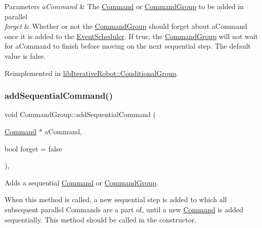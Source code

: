 \begin{DoxyParams}{Parameters}
{\em a\+Command} & The \mbox{\hyperlink{classlib_iterative_robot_1_1_command}{Command}} or \mbox{\hyperlink{classlib_iterative_robot_1_1_command_group}{Command\+Group}} to be added in parallel \\
\hline
{\em forget} & Whether or not the \mbox{\hyperlink{classlib_iterative_robot_1_1_command_group}{Command\+Group}} should forget about a\+Command once it is added to the \mbox{\hyperlink{classlib_iterative_robot_1_1_event_scheduler}{Event\+Scheduler}}. If true, the \mbox{\hyperlink{classlib_iterative_robot_1_1_command_group}{Command\+Group}} will not wait for a\+Command to finish before moving on the next sequential step. The default value is false. \\
\hline
\end{DoxyParams}


Reimplemented in \mbox{\hyperlink{classlib_iterative_robot_1_1_conditional_group_ad2fb980aee316a64e8127adc4a600848}{lib\+Iterative\+Robot\+::\+Conditional\+Group}}.

\mbox{\label{classlib_iterative_robot_1_1_command_group_a7e3167a89a45e6b1fc5df9a18c2946b7}} 
\subsubsection{\texorpdfstring{addSequentialCommand()}{addSequentialCommand()}}
{\footnotesize\ttfamily void Command\+Group\+::add\+Sequential\+Command (\begin{DoxyParamCaption}\item[{\mbox{\hyperlink{classlib_iterative_robot_1_1_command}{Command}} $\ast$}]{a\+Command,  }\item[{bool}]{forget = {\ttfamily false} }\end{DoxyParamCaption})\hspace{0.3cm}{\ttfamily [protected]}, {\ttfamily [virtual]}}



Adds a sequential \mbox{\hyperlink{classlib_iterative_robot_1_1_command}{Command}} or \mbox{\hyperlink{classlib_iterative_robot_1_1_command_group}{Command\+Group}}. 

When this method is called, a new sequential step is added to which all subsequent parallel Commands are a part of, until a new \mbox{\hyperlink{classlib_iterative_robot_1_1_command}{Command}} is added sequentially. This method should be called in the constructor.


